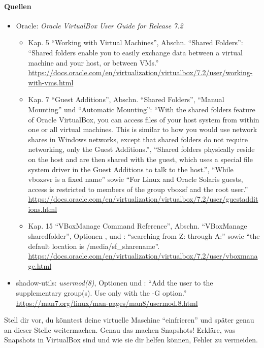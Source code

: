 \paragraph{Quellen}
\begin{itemize}[quellen]
  \item Oracle: \emph{Oracle VirtualBox User Guide for Release 7.2}
  \begin{itemize}[nosep]
    \item Kap. 5 \enquote{Working with Virtual Machines}, Abschn. \enquote{Shared Folders}: \enquote{Shared folders enable you to easily exchange data between a virtual machine and your host, or between VMs.} \url{https://docs.oracle.com/en/virtualization/virtualbox/7.2/user/working-with-vms.html}
    \item Kap. 7 \enquote{Guest Additions}, Abschn. \enquote{Shared Folders}, \enquote{Manual Mounting} und \enquote{Automatic Mounting}: \enquote{With the shared folders feature of Oracle VirtualBox, you can access files of your host system from within one or all virtual machines. This is similar to how you would use network shares in Windows networks, except that shared folders do not require networking, only the Guest Additions.}, \enquote{Shared folders physically reside on the host and are then shared with the guest, which uses a special file system driver in the Guest Additions to talk to the host.}, \enquote{While vboxsvr is a fixed name} sowie \enquote{For Linux and Oracle Solaris guests, access is restricted to members of the group vboxsf and the root user.} \url{https://docs.oracle.com/en/virtualization/virtualbox/7.2/user/guestadditions.html}
    \item Kap. 15 \enquote{VBoxManage Command Reference}, Abschn. \enquote{VBoxManage sharedfolder}, Optionen ,  und : \enquote{searching from Z: through A:} sowie \enquote{the default location is /media/sf\_sharename}. \url{https://docs.oracle.com/en/virtualization/virtualbox/7.2/user/vboxmanage.html}
  \end{itemize}
  \item shadow-utils: \emph{usermod(8)}, Optionen  und : \enquote{Add the user to the supplementary group(s). Use only with the -G option.} \url{https://man7.org/linux/man-pages/man8/usermod.8.html}
\end{itemize}

\begin{aufgabe}
Stell dir vor, du könntest deine virtuelle Maschine \enquote{einfrieren} und später genau an dieser Stelle weitermachen. Genau das machen Snapshots! Erkläre, was Snapshots in VirtualBox sind und wie sie dir helfen können, Fehler zu vermeiden.
\end{aufgabe}
\label{sec:snapshots}

